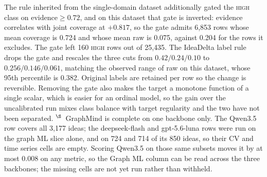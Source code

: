 The rule inherited from the single-domain dataset additionally gated the
\textsc{high} class on $\text{evidence}\ge 0.72$, and on this dataset that gate is
inverted: evidence correlates with joint coverage at $+0.817$, so the gate admits
6{,}853 rows whose mean coverage is 0.724 and whose mean raw is 0.075, against
0.204 for the rows it excludes. The gate left 160 \textsc{high} rows out of
25{,}435. The IdeaDelta label rule drops the gate and rescales the three cuts from
$0.42/0.24/0.10$ to $0.256/0.146/0.061$, matching the observed range of raw on
this dataset, whose 95th percentile is 0.382. Original labels are retained per row
so the change is reversible. Removing the gate also makes the target a monotone
function of a single scalar, which is easier for an ordinal model, so the gain
over the uncalibrated run mixes class balance with target regularity and the two
have not been separated.
$^{\S}$~GraphMind is complete on one backbone only. The Qwen3.5 row covers all
3{,}177 ideas; the deepseek-flash and gpt-5.6-luna rows were run on the graph ML
slice alone, and on 724 and 714 of its 850 ideas, so their CV and time series
cells are empty. Scoring Qwen3.5 on those same subsets moves it by at most
$0.008$ on any metric, so the Graph ML column can be read across the three
backbones; the missing cells are not yet run rather than withheld.

